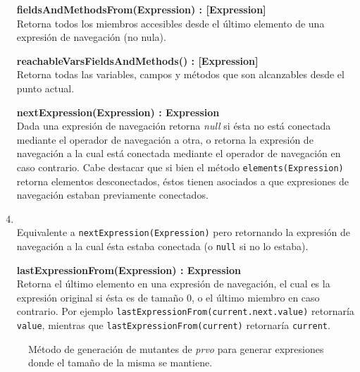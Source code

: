 \begin{enumerate}[leftmargin=.75cm,align=left]
	\item[\textbf{fieldsAndMethodsFrom(Expression) : [Expression]}]\mbox{}\\ Retorna todos los miembros accesibles desde el \'ultimo elemento de una expresi\'on de navegaci\'on (no nula).
	
	\item[\textbf{reachableVarsFieldsAndMethods() : [Expression]}]\mbox{}\\ Retorna todas las variables, campos y m\'etodos que son alcanzables desde el punto actual.
	
	\item[\textbf{nextExpression(Expression) : Expression}]\mbox{}\\ Dada una expresi\'on de navegaci\'on retorna \emph{null} si \'esta no est\'a conectada mediante el operador de navegaci\'on a otra, o retorna la expresi\'on de navegaci\'on a la cual est\'a conectada mediante el operador de navegaci\'on en caso contrario. Cabe destacar que si bien el m\'etodo \lstinline{elements(Expression)} retorna elementos desconectados, \'estos tienen asociados a que expresiones de navegaci\'on estaban previamente conectados.
	
	\item[\textbf{previousExpression(Expression) : Expression}]\mbox{}\\ Equivalente a \lstinline{nextExpression(Expression)} pero retornando la expresi\'on de navegaci\'on a la cual \'esta estaba conectada (o \lstinline{null} si no lo estaba).
	
	\item[\textbf{lastExpressionFrom(Expression) : Expression}]\mbox{}\\ Retorna el \'ultimo elemento en una expresi\'on de navegaci\'on, el cual es la expresi\'on original si \'esta es de tama\~no $0$, o el \'ultimo miembro en caso contrario. Por ejemplo \lstinline{lastExpressionFrom(current.next.value)} retornar\'ia \lstinline{value}, mientras que \lstinline{lastExpressionFrom(current)} retornar\'ia \lstinline{current}.
\end{enumerate}

\begin{figure}
	
	\caption{M\'etodo de generaci\'on de mutantes de \emph{prvo} para generar expresiones donde el tama\~no de la misma se mantiene.}
	\label{figures.code.prvoMethods.sameLength}
\end{figure}

